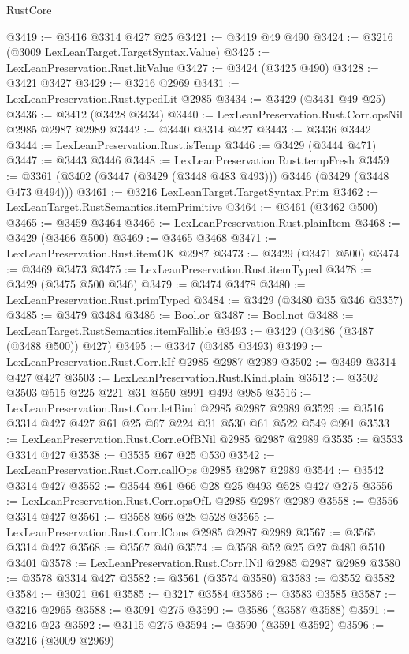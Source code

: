 \begin{lexlean}{RustCore}
\begin{coremodule}
@3419 := @3416 @3314 @427 @25
@3421 := @3419 @49 @490
@3424 := @3216 (@3009 LexLeanTarget.TargetSyntax.Value)
@3425 := LexLeanPreservation.Rust.litValue
@3427 := @3424 (@3425 @490)
@3428 := @3421 @3427
@3429 := @3216 @2969
@3431 := LexLeanPreservation.Rust.typedLit @2985
@3434 := @3429 (@3431 @49 @25)
@3436 := @3412 (@3428 @3434)
@3440 := LexLeanPreservation.Rust.Corr.opsNil @2985 @2987 @2989
@3442 := @3440 @3314 @427
@3443 := @3436 @3442
@3444 := LexLeanPreservation.Rust.isTemp
@3446 := @3429 (@3444 @471)
@3447 := @3443 @3446
@3448 := LexLeanPreservation.Rust.tempFresh
@3459 := @3361 (@3402 (@3447 (@3429 (@3448 @483 @493))) @3446 (@3429 (@3448 @473 @494)))
@3461 := @3216 LexLeanTarget.TargetSyntax.Prim
@3462 := LexLeanTarget.RustSemantics.itemPrimitive
@3464 := @3461 (@3462 @500)
@3465 := @3459 @3464
@3466 := LexLeanPreservation.Rust.plainItem
@3468 := @3429 (@3466 @500)
@3469 := @3465 @3468
@3471 := LexLeanPreservation.Rust.itemOK @2987
@3473 := @3429 (@3471 @500)
@3474 := @3469 @3473
@3475 := LexLeanPreservation.Rust.itemTyped
@3478 := @3429 (@3475 @500 @346)
@3479 := @3474 @3478
@3480 := LexLeanPreservation.Rust.primTyped
@3484 := @3429 (@3480 @35 @346 @3357)
@3485 := @3479 @3484
@3486 := Bool.or
@3487 := Bool.not
@3488 := LexLeanTarget.RustSemantics.itemFallible
@3493 := @3429 (@3486 (@3487 (@3488 @500)) @427)
@3495 := @3347 (@3485 @3493)
@3499 := LexLeanPreservation.Rust.Corr.kIf @2985 @2987 @2989
@3502 := @3499 @3314 @427 @427
@3503 := LexLeanPreservation.Rust.Kind.plain
@3512 := @3502 @3503 @515 @225 @221 @31 @550 @991 @493 @985
@3516 := LexLeanPreservation.Rust.Corr.letBind @2985 @2987 @2989
@3529 := @3516 @3314 @427 @427 @61 @25 @67 @224 @31 @530 @61 @522 @549 @991
@3533 := LexLeanPreservation.Rust.Corr.eOfBNil @2985 @2987 @2989
@3535 := @3533 @3314 @427
@3538 := @3535 @67 @25 @530
@3542 := LexLeanPreservation.Rust.Corr.callOps @2985 @2987 @2989
@3544 := @3542 @3314 @427
@3552 := @3544 @61 @66 @28 @25 @493 @528 @427 @275
@3556 := LexLeanPreservation.Rust.Corr.opsOfL @2985 @2987 @2989
@3558 := @3556 @3314 @427
@3561 := @3558 @66 @28 @528
@3565 := LexLeanPreservation.Rust.Corr.lCons @2985 @2987 @2989
@3567 := @3565 @3314 @427
@3568 := @3567 @40
@3574 := @3568 @52 @25 @27 @480 @510 @3401
@3578 := LexLeanPreservation.Rust.Corr.lNil @2985 @2987 @2989
@3580 := @3578 @3314 @427
@3582 := @3561 (@3574 @3580)
@3583 := @3552 @3582
@3584 := @3021 @61
@3585 := @3217 @3584
@3586 := @3583 @3585
@3587 := @3216 @2965
@3588 := @3091 @275
@3590 := @3586 (@3587 @3588)
@3591 := @3216 @23
@3592 := @3115 @275
@3594 := @3590 (@3591 @3592)
@3596 := @3216 (@3009 @2969)

\end{coremodule}
\end{lexlean}

